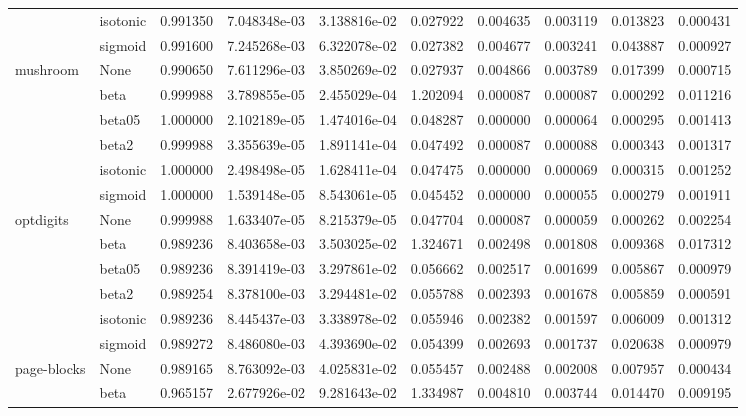 \begin{tabular}{llrrrrrrrr}
        & isotonic &  0.991350 &  7.048348e-03 &  3.138816e-02 &   0.027922 &  0.004635 &  0.003119 &  0.013823 &  0.000431 \\
        & sigmoid &  0.991600 &  7.245268e-03 &  6.322078e-02 &   0.027382 &  0.004677 &  0.003241 &  0.043887 &  0.000927 \\
mushroom & None &  0.990650 &  7.611296e-03 &  3.850269e-02 &   0.027937 &  0.004866 &  0.003789 &  0.017399 &  0.000715 \\
        & beta &  0.999988 &  3.789855e-05 &  2.455029e-04 &   1.202094 &  0.000087 &  0.000087 &  0.000292 &  0.011216 \\
        & beta05 &  1.000000 &  2.102189e-05 &  1.474016e-04 &   0.048287 &  0.000000 &  0.000064 &  0.000295 &  0.001413 \\
        & beta2 &  0.999988 &  3.355639e-05 &  1.891141e-04 &   0.047492 &  0.000087 &  0.000088 &  0.000343 &  0.001317 \\
        & isotonic &  1.000000 &  2.498498e-05 &  1.628411e-04 &   0.047475 &  0.000000 &  0.000069 &  0.000315 &  0.001252 \\
        & sigmoid &  1.000000 &  1.539148e-05 &  8.543061e-05 &   0.045452 &  0.000000 &  0.000055 &  0.000279 &  0.001911 \\
optdigits & None &  0.999988 &  1.633407e-05 &  8.215379e-05 &   0.047704 &  0.000087 &  0.000059 &  0.000262 &  0.002254 \\
        & beta &  0.989236 &  8.403658e-03 &  3.503025e-02 &   1.324671 &  0.002498 &  0.001808 &  0.009368 &  0.017312 \\
        & beta05 &  0.989236 &  8.391419e-03 &  3.297861e-02 &   0.056662 &  0.002517 &  0.001699 &  0.005867 &  0.000979 \\
        & beta2 &  0.989254 &  8.378100e-03 &  3.294481e-02 &   0.055788 &  0.002393 &  0.001678 &  0.005859 &  0.000591 \\
        & isotonic &  0.989236 &  8.445437e-03 &  3.338978e-02 &   0.055946 &  0.002382 &  0.001597 &  0.006009 &  0.001312 \\
        & sigmoid &  0.989272 &  8.486080e-03 &  4.393690e-02 &   0.054399 &  0.002693 &  0.001737 &  0.020638 &  0.000979 \\
page-blocks & None &  0.989165 &  8.763092e-03 &  4.025831e-02 &   0.055457 &  0.002488 &  0.002008 &  0.007957 &  0.000434 \\
        & beta &  0.965157 &  2.677926e-02 &  9.281643e-02 &   1.334987 &  0.004810 &  0.003744 &  0.014470 &  0.009195 \\

\end{tabular}
